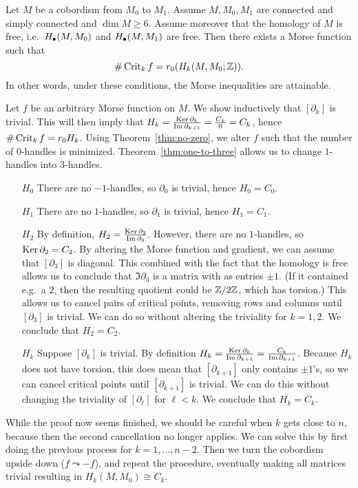 \begin{theorem}[Smale]
    Let $M$ be a cobordism from $M_0$ to $M_1$.
    Assume $M, M_0, M_1$ are connected and simply connected and $\dim M \ge 6$.
    Assume moreover that the homology of $M$ is free, i.e.\ $H_{\bullet}(M, M_0)$ and $H_{\bullet}(M, M_1)$ are free.
    Then there exists a Morse function such that
    \[
        \# \operatorname{Crit}_k f = r_0(H_k(M, M_0; \mathbb{Z}))
    .\] 
    In other words, under these conditions, the Morse inequalities are attainable.
    \label{thm:minimal-cob}
\end{theorem}
\begin{myproof}
    Let $f$ be an arbitrary Morse function on $M$.
    We show inductively that $[\partial_k]$ is trivial.
    This will then imply that $H_k = \frac{\operatorname{Ker} \partial_k}{\operatorname{Im} \partial_{k+1}} = \frac{C_k}{0} = C_k$, hence $\# \operatorname{Crit}_kf = r_0 H_k$.
    Using Theorem~\ref{thm:no-zero}, we alter $f$ such that the number of $0$-handles is minimized. Theorem~\ref{thm:one-to-three} allows us to change $1$-handles into $3$-handles.
    \begin{enumerate}
        \item[$H_0$]
            There are no $-1$-handles, so  $\partial_0$ is trivial, hence  $H_0 = C_0$.
        \item[$H_1$]
            There are no $1$-handles, so $\partial_1$ is trivial, hence  $H_1 = C_1$.
        \item[$ H_2$]
            By definition, $H_2 = \frac{\operatorname{Ker} \partial_2}{\operatorname{Im} \partial_3}$.
            However, there are no $1$-handles,
            so $\operatorname{Ker} \partial_2 = C_2$.
            By altering the Morse function and gradient, we can assume that $[\partial_3]$ is diagonal.
            This combined with the fact that the homology is free allows us to conclude that $\Im \partial_3$ is a matrix with as entries $\pm 1$.
            (If it contained e.g.\ a $2$, then the resulting quotient could be  $\mathbb{Z} / 2 \mathbb{Z}$, which has torsion.)
            This allows us to cancel pairs of critical points, removing rows and columns until $[\partial_3]$ is trivial.
            We can do so without altering the triviality for $k = 1,2$.
            We conclude that $H_2 = C_2$.
        \item [$H_k$]
            Suppose $[\partial_k]$ is trivial.
            By definition $H_k = \frac{\operatorname{Ker} \partial_k}{\operatorname{Im} \partial_{k+1}} = \frac{C_k}{\operatorname{Im} \partial_{k+1}}$.
            Because $H_k$ does not have torsion, this does mean that $[\partial_{k+1}]$ only contains $\pm 1$'s, so we can cancel critical points until  $[\partial_{k+1}]$ is trivial. We can do this without changing the triviality of $[\partial_\ell]$ for $\ell < k$.
            We conclude that $H_k = C_k$.
    \end{enumerate}
    While the proof now seems finished, we should be careful when $k$ gets close to  $n$, because then the second cancellation no longer applies.
    We can solve this by first doing the previous process for $k = 1, \ldots, n-2$. 
    Then we turn the cobordism upside down ($f \leadsto -f$), and repeat the procedure, eventually making all matrices trivial resulting in $H_k(M, M_0) \cong C_k$.
\end{myproof}
